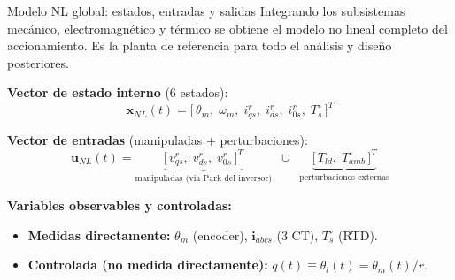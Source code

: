 \documentclass[aspectratio=169,t]{beamer}
\begin{document}
\begin{frame}{Modelo NL global: estados, entradas y salidas}
{\small\color{uncGray}Integrando los subsistemas mecánico, electromagnético y térmico se obtiene el modelo no lineal completo del accionamiento. Es la planta de referencia para todo el análisis y diseño posteriores.}\par
\vspace{4mm}

\textbf{Vector de estado interno} (6 estados):
\begin{equation*}
\bm{x}_{NL}(t) = \big[\,\theta_m,\;\omega_m,\;i_{qs}^{r},\;i_{ds}^{r},\;i_{0s}^{r},\;T_s^\circ\,\big]^T
\end{equation*}

\textbf{Vector de entradas} (manipuladas + perturbaciones):
\begin{equation*}
\bm{u}_{NL}(t) = \underbrace{\big[\,v_{qs}^{r},\;v_{ds}^{r},\;v_{0s}^{r}\,\big]^T}_{\text{manipuladas (vía Park del inversor)}} \;\;\cup\;\; \underbrace{\big[\,T_{ld},\;T_{amb}^\circ\,\big]^T}_{\text{perturbaciones externas}}
\end{equation*}

\textbf{Variables observables y controladas:}
\begin{itemize}\small
\item \textbf{Medidas directamente:} $\theta_m$ (encoder), $\bm{i}_{abcs}$ (3 CT), $T_s^\circ$ (RTD).
\item \textbf{Controlada (no medida directamente):} $q(t)\equiv\theta_l(t) = \theta_m(t)/r$.
\end{itemize}
\end{frame}
\end{document}
